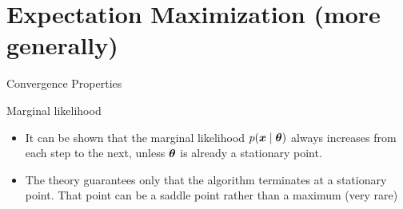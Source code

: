 \documentclass[10pt]{beamer}
\begin{document}
\section{Expectation Maximization (more generally)}



\begin{frame}{Convergence Properties}
\footnotesize
\begin{sblock}{Marginal likelihood}
\begin{itemize}
\item It can be shown that the marginal likelihood $p({\boldsymbol x} \; | \; {\boldsymbol \theta})$ always increases from each step to the next, unless ${\boldsymbol \theta}$ is already a stationary point.
\item The theory guarantees only that the algorithm terminates at a stationary point.  That point can be a saddle point rather than a maximum (very rare)


\end{itemize}
\end{sblock}
\end{frame}
\end{document}
